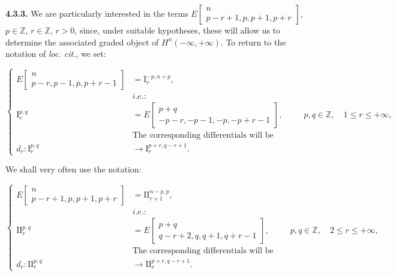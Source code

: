 \clearpage
{}%
\begingroup\small\setlength{\parskip}{0pt}\setlength{\emergencystretch}{1.5em}
\medskip\noindent\textbf{4.3.3.}\quad
We are particularly interested in the terms
$E\!\left[\begin{smallmatrix}n\\p-r+1,p,p+1,p+r\end{smallmatrix}\right]$,
$p\in\mathbb Z$, $r\in\mathbb Z$, $r>0$, since, under suitable
hypotheses, these will allow us to determine the associated graded object of
$H^n(-\infty,+\infty)$. To return to the notation of \emph{loc. cit.}, we
set:

\[
\left\{
\begin{aligned}
E\!\left[\begin{smallmatrix}n\\p-r,p-1,p,p+r-1\end{smallmatrix}\right]
  &=\mathrm I_r^{-p,n+p},\\
&\textit{i.e.}:\\[-2pt]
\mathrm I_r^{p,q}
  &=E\!\left[\begin{smallmatrix}p+q\\-p-r,-p-1,-p,-p+r-1\end{smallmatrix}\right],
  &&p,q\in\mathbb Z,\quad 1\leq r\leq+\infty,\\
&\text{The corresponding differentials will be denoted by:}\\[-2pt]
d_r\colon\mathrm I_r^{p,q}&\longrightarrow
  \mathrm I_r^{p+r,q-r+1}.
\end{aligned}
\right.
\tag{4.3.3.1}
\]

We shall very often use the notation:

\[
\left\{
\begin{aligned}
E\!\left[\begin{smallmatrix}n\\p-r+1,p,p+1,p+r\end{smallmatrix}\right]
  &=\mathrm{II}_{r+1}^{n-p,p},\\
&\textit{i.e.}:\\[-2pt]
\mathrm{II}_r^{p,q}
  &=E\!\left[\begin{smallmatrix}p+q\\q-r+2,q,q+1,q+r-1\end{smallmatrix}\right],
  &&p,q\in\mathbb Z,\quad 2\leq r\leq+\infty,\\
&\text{The corresponding differentials will be denoted by:}\\[-2pt]
d_r\colon\mathrm{II}_r^{p,q}&\longrightarrow
  \mathrm{II}_r^{p+r,q-r+1}.
\end{aligned}
\right.
\tag{4.3.3.2}
\]

